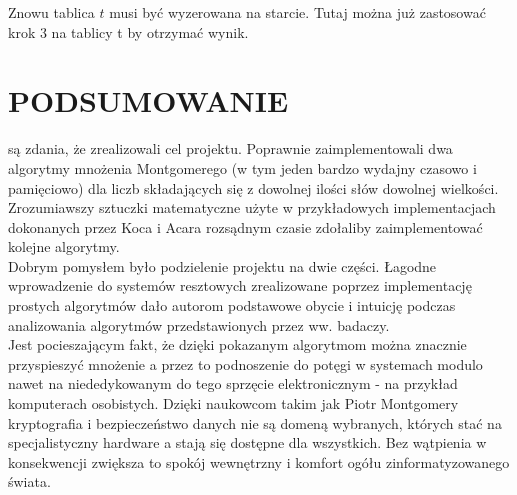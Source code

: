 \documentclass[10pt,journal,compsoc]{IEEEtran}
\begin{document}
\noindent Znowu tablica $t$ musi być wyzerowana na starcie. Tutaj można już zastosować krok 3 na tablicy t by otrzymać wynik.

\section{PODSUMOWANIE}
 są zdania, że zrealizowali cel projektu. Poprawnie zaimplementowali dwa algorytmy mnożenia Montgomerego (w tym jeden bardzo wydajny czasowo i pamięciowo) dla liczb składających się z dowolnej ilości słów dowolnej wielkości. Zrozumiawszy sztuczki matematyczne użyte w przykładowych implementacjach dokonanych przez Koca i Acara rozsądnym czasie zdołaliby zaimplementować kolejne algorytmy.  \\
Dobrym pomysłem było podzielenie projektu na dwie części. Łagodne wprowadzenie do systemów resztowych zrealizowane poprzez implementację prostych algorytmów dało autorom podstawowe obycie i intuicję podczas analizowania algorytmów przedstawionych przez ww. badaczy. \\
Jest pocieszającym fakt, że dzięki pokazanym algorytmom można znacznie przyspieszyć mnożenie a przez to podnoszenie do potęgi w systemach modulo nawet na niededykowanym do tego sprzęcie elektronicznym - na przykład komputerach osobistych. Dzięki naukowcom takim jak Piotr Montgomery kryptografia i bezpieczeństwo danych nie są domeną wybranych, których stać na specjalistyczny hardware a stają się dostępne dla wszystkich. Bez wątpienia w konsekwencji zwiększa to spokój wewnętrzny i komfort ogółu zinformatyzowanego świata.

\appendices
\end{document}
